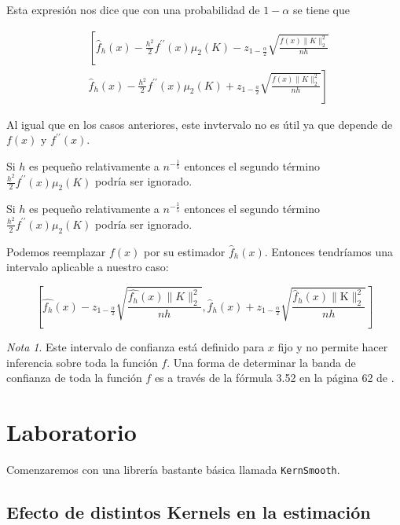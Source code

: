 \documentclass[
  12pt,
]{book}
\theoremstyle{definition}
\theoremstyle{definition}
\theoremstyle{definition}
\theoremstyle{definition}
\theoremstyle{remark}
\newtheorem*{remark}{Nota}
\begin{document}
Esta expresión nos dice que con una probabilidad de \(1-\alpha\) se tiene
que

\begin{equation*}
\begin{aligned}
& \left[\hat{f}_{h}(x)-\frac{h^{2}}{2} f^{\prime \prime}(x) \mu_{2}(K)-z_{1-\frac{\alpha}{2}} \sqrt{\frac{f(x)\|K\|_{2}^{2}}{n h}}\right. \\
& \left.\widehat{f}_{h}(x)-\frac{h^{2}}{2} f^{\prime \prime}(x) \mu_{2}(K)+z_{1-\frac{a}{2}} \sqrt{\frac{f(x)\|K\|_{2}^{2}}{n h}}\right]
\end{aligned}
\end{equation*}

Al igual que en los casos anteriores, este invtervalo no es útil ya que
depende de \(f(x)\) y \(f^{\prime\prime} (x)\).

Si \(h\) es pequeño relativamente a \(n^{-\frac{1}{5}}\) entonces el segundo
término \(\frac{h^{2}}{2} f^{\prime \prime}(x) \mu_{2}(K)\) podría ser
ignorado.

Si \(h\) es pequeño relativamente a \(n^{-\frac{1}{5}}\) entonces el segundo término \(\frac{h^{2}}{2} f^{\prime \prime}(x) \mu_{2}(K)\) podría ser ignorado.

Podemos reemplazar \(f(x)\) por su estimador \(\hat{f}_{h}(x)\). Entonces tendríamos una intervalo aplicable a nuestro caso:

\begin{equation*}
\left[\hat{f_{h}}(x)-z_{1-\frac{\alpha}{2}} \sqrt{\frac{\hat{f_{h}}(x)\|K\|_{2}^{2}}{n h}}, \hat{f}_{h}(x)+z_{1-\frac{\alpha}{2}} \sqrt{\frac{\hat{f}_{h}(x)\|\mathrm{K}\|_{2}^{2}}{n h}}\right]
\end{equation*}

\begin{remark}
Este intervalo de confianza está definido para \(x\) fijo y no permite hacer inferencia sobre toda la función \(f\). Una forma de determinar la banda de confianza de toda la función \(f\) es a través de la fórmula 3.52 en la página 62 de \autocite{HardleNonparametric2004}.
\end{remark}

\hypertarget{laboratorio}{%
\section{Laboratorio}\label{laboratorio}}

Comenzaremos con una librería bastante básica llamada
\texttt{KernSmooth}.

\hypertarget{efecto-de-distintos-kernels-en-la-estimaciuxf3n}{%
\subsection{Efecto de distintos Kernels en la estimación}\label{efecto-de-distintos-kernels-en-la-estimaciuxf3n}}
\end{document}
